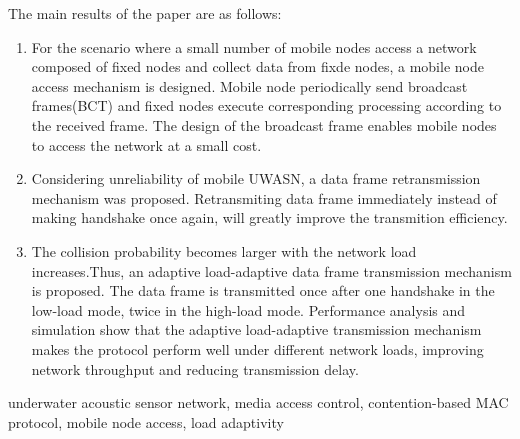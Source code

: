 \noindent The main results of the paper are as follows:
\vspace{-12pt}
\begin{enumerate} \setlength{\itemsep}{0pt}
	\item For the scenario where a small number of mobile nodes access a network composed of fixed nodes and collect data from fixde nodes, a mobile node access mechanism is designed. Mobile node periodically send broadcast frames(BCT) and fixed nodes execute corresponding processing according to the received frame. The design of the broadcast frame enables mobile nodes to access the network at a small cost.
	\item Considering unreliability of mobile UWASN, a data frame retransmission mechanism was proposed. Retransmiting data frame immediately instead of making handshake once again, will greatly improve the transmition efficiency. 
	\item The collision probability becomes larger with the network load increases.Thus, an adaptive load-adaptive data frame transmission mechanism is proposed. The data frame is transmitted once after one handshake in the low-load mode, twice in the high-load mode. Performance analysis and simulation show that the adaptive load-adaptive transmission mechanism makes the protocol perform well under different network loads, improving network throughput and reducing transmission delay.

\end{enumerate}
\vspace{-12pt}

\vspace{1em}
 \quad underwater acoustic sensor network, media access control, contention-based MAC protocol, mobile node access, load adaptivity

\clearpage
\endinput